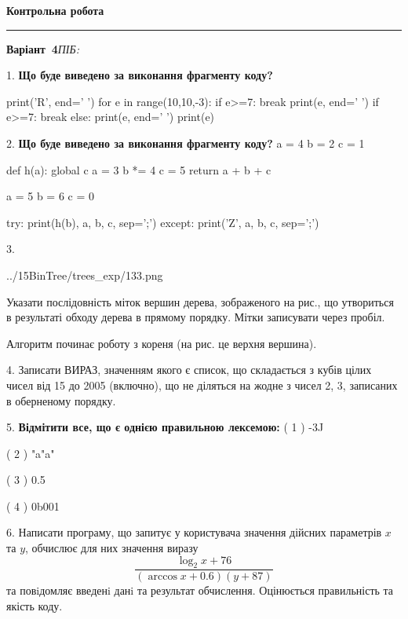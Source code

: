 \documentclass[11pt]{article}
\begin{document}
{\centering\Large\bfseries Контрольна робота\par}
\medskip
\noindent\rule{\linewidth}{0.5pt}
\smallskip
\noindent\textbf{Варіант \No\,4}\hfill \textit{ПІБ:}\,\underline{\hspace{60mm}}
\vspace{4mm}

1. \textbf{Що буде виведено за виконання фрагменту коду?}

print('R', end=' ')
for e in range(10,10,-3):
    if e>=7:
        break
        print(e, end=' ')
    if e>=7:
        break
    else:
        print(e, end=' ')
    print(e)
\vspace{5mm}

2. \textbf{Що буде виведено за виконання фрагменту коду?}
a = 4
b = 2
c = 1

def h(a):
global c    a = 3
    b *= 4
    c = 5
    return a + b + c

a = 5
b = 6
c = 0

try:
    print(h(b), a, b, c, sep=';')
except:
    print('Z', a, b, c, sep=';')
\vspace{5mm}

3. 

\begin{center}
	{../15BinTree/trees_exp/133.png}
\end{center}
Указати послідовність міток вершин дерева, зображеного на рис., що утвориться в результаті обходу дерева в прямому порядку. Мітки записувати через пробіл.\par Алгоритм починає роботу з кореня (на рис. це верхня вершина).
\vspace{5mm}

4. 
Записати ВИРАЗ, значенням якого є список, що складається з кубів цілих чисел від 15 до 2005 (включно), що не діляться на жодне з чисел 2, 3, записаних в оберненому порядку.\vspace{5mm}

5. %
\textbf{Відмітити все, що є однією правильною лексемою:}
( 1 ) -3J

( 2 ) "a"a"

( 3 ) 0.5

( 4 ) 0b001
\vspace{5mm}

6. 
Написати програму, що запитує у користувача значення дійсних параметрів $x$ та $y$, обчислює для них значення виразу 
$$\frac{\log_{2} x + 76}{(\arccos x + 0.6) (y + 87)}$$ 
та повiдомляє введенi данi та результат обчислення.
 Оцінюється правильність та якість коду.
\end{document}
